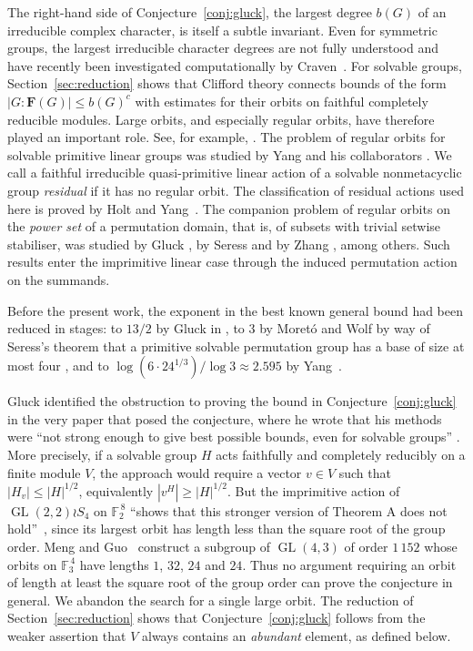 \documentclass[10pt]{amsart}
\theoremstyle{definition}
\renewcommand{\le}{\leqslant}
\renewcommand{\ge}{\geqslant}
\renewcommand{\leq}{\leqslant}
\DeclareMathOperator{\GL}{GL}
\numberwithin{equation}{section}
\numberwithin{table}{section}
\begin{document}
The right-hand side of Conjecture~\ref{conj:gluck}, the largest degree $b(G)$ of an irreducible complex character, is itself a subtle invariant. Even for symmetric groups, the largest irreducible character degrees are not fully understood and have recently been investigated computationally by Craven~\cite{Craven25}. For solvable groups, Section~\ref{sec:reduction} shows that Clifford theory connects bounds of the form $|G:\mathbf{F}(G)|\leq b(G)^c$ with estimates for their orbits on faithful completely reducible modules. Large orbits, and especially regular orbits, have therefore played an important role. See, for example, \cite{Dolfi08,KellerYang14,MengBBER20,Wolf99}. The problem of regular orbits for solvable primitive linear groups was studied by Yang and his collaborators \cite{Yang10, Yang11b, YangVV22}. We call a faithful irreducible quasi-primitive linear action of a solvable nonmetacyclic group \emph{residual} if it has no regular orbit. The classification of residual actions used here is proved by Holt and Yang~\cite{HY23}. The
companion problem of regular orbits on the {\it power set} of a permutation domain, that is, of subsets with trivial setwise stabiliser, was studied by Gluck \cite{Glu83, Glu25}, by Seress \cite{Seress97} and by Zhang \cite{Zhang97}, among others. Such results enter the imprimitive linear case through the induced permutation action on the summands.

Before the present work, the exponent in the best known general bound had been
reduced in stages: to $13/2$ by Gluck in \cite{Glu85}, to $3$ by
Moret\'o and Wolf \cite{MoretoWolf04} by way of Seress's theorem that a primitive
solvable permutation group has a base of size at most four \cite{Seress96}, and to $\log(6\cdot 24^{1/3})/\log 3\approx 2.595$ by Yang~\cite{Yang23}.

Gluck identified the obstruction to proving the bound in Conjecture~\ref{conj:gluck} in the very paper that posed the conjecture, where he wrote that his methods were ``not strong enough to give best possible bounds, even for solvable groups'' \cite[p. 443]{Glu85}. More precisely, if a solvable group $H$ acts faithfully and completely
reducibly on a finite module $V$, the approach would require a vector
$v\in V$ such that $|H_v|\le |H|^{1/2}$, equivalently $|v^H|\ge |H|^{1/2}$. But the imprimitive action of $\GL(2,2)\wr S_4$ on
$\mathbb{F}_2^{\,8}$ ``shows that this stronger version of Theorem A does
not hold''~\cite[p.~447]{Glu85}, since its largest orbit has length less than the square root of the group order. Meng and Guo~\cite[Lemma~8(2)]{MengGuo25} construct a subgroup of $\GL(4,3)$ of order $1\,152$ whose orbits on $\mathbb{F}_3^{\,4}$ have lengths $1$, $32$, $24$ and $24$. Thus no argument requiring an orbit of length at least the square root of the group order can prove the conjecture in general. We abandon the search for a single large orbit. The reduction of Section~\ref{sec:reduction} shows that Conjecture~\ref{conj:gluck} follows from the weaker assertion that $V$ always contains an \emph{abundant} element, as defined below.
\end{document}
